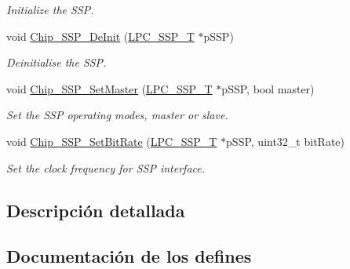 \begin{DoxyCompactItemize}
\begin{DoxyCompactList}\small\item\em Initialize the S\+SP. \end{DoxyCompactList}\item 
void \hyperlink{group___s_s_p__18_x_x__43_x_x_ga48f87506f2fddc1043606eae292b6f16}{Chip\+\_\+\+S\+S\+P\+\_\+\+De\+Init} (\hyperlink{struct_l_p_c___s_s_p___t}{L\+P\+C\+\_\+\+S\+S\+P\+\_\+T} $\ast$p\+S\+SP)
\begin{DoxyCompactList}\small\item\em Deinitialise the S\+SP. \end{DoxyCompactList}\item 
void \hyperlink{group___s_s_p__18_x_x__43_x_x_ga60e601329b0aa6afe5f355dc6e8f84bd}{Chip\+\_\+\+S\+S\+P\+\_\+\+Set\+Master} (\hyperlink{struct_l_p_c___s_s_p___t}{L\+P\+C\+\_\+\+S\+S\+P\+\_\+T} $\ast$p\+S\+SP, bool master)
\begin{DoxyCompactList}\small\item\em Set the S\+SP operating modes, master or slave. \end{DoxyCompactList}\item 
void \hyperlink{group___s_s_p__18_x_x__43_x_x_ga373660d8ad7b28fb71209539b1e72717}{Chip\+\_\+\+S\+S\+P\+\_\+\+Set\+Bit\+Rate} (\hyperlink{struct_l_p_c___s_s_p___t}{L\+P\+C\+\_\+\+S\+S\+P\+\_\+T} $\ast$p\+S\+SP, uint32\+\_\+t bit\+Rate)
\begin{DoxyCompactList}\small\item\em Set the clock frequency for S\+SP interface. \end{DoxyCompactList}\end{DoxyCompactItemize}


\subsection{Descripción detallada}


\subsection{Documentación de los \textquotesingle{}defines\textquotesingle{}}
